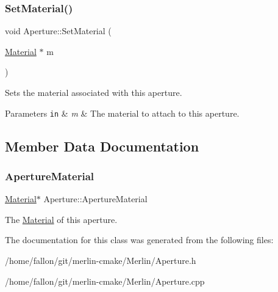 \mbox{\label{classAperture_aa35484166441c2be0e2e159c6d6f4a11}} 
\subsubsection{\texorpdfstring{Set\+Material()}{SetMaterial()}}
{\footnotesize\ttfamily void Aperture\+::\+Set\+Material (\begin{DoxyParamCaption}\item[{\hyperlink{classMaterial}{Material} $\ast$}]{m }\end{DoxyParamCaption})}

Sets the material associated with this aperture. 
\begin{DoxyParams}[1]{Parameters}
\mbox{\tt in}  & {\em m} & The material to attach to this aperture. \\
\hline
\end{DoxyParams}


\subsection{Member Data Documentation}
\mbox{\label{classAperture_ae92ba16dcfebf1949db67b8fc0ae3c7b}} 
\subsubsection{\texorpdfstring{Aperture\+Material}{ApertureMaterial}}
{\footnotesize\ttfamily \hyperlink{classMaterial}{Material}$\ast$ Aperture\+::\+Aperture\+Material\hspace{0.3cm}{\ttfamily [protected]}}

The \hyperlink{classMaterial}{Material} of this aperture. 

The documentation for this class was generated from the following files\+:\begin{DoxyCompactItemize}
\item 
/home/fallon/git/merlin-\/cmake/\+Merlin/Aperture.\+h\item 
/home/fallon/git/merlin-\/cmake/\+Merlin/Aperture.\+cpp\end{DoxyCompactItemize}
